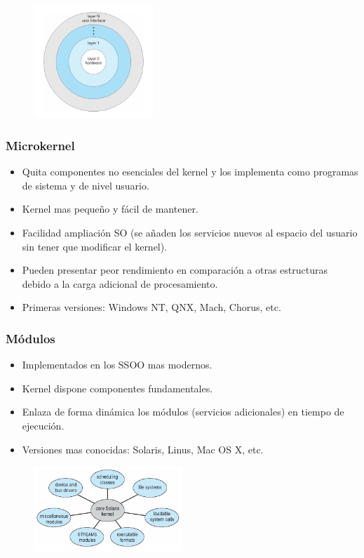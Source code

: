 \documentclass{templateNote}
\begin{document}
\begin{figure}[H]
    \centering
    \includegraphics[width=0.4\textwidth]{img/estNiv.png}
\end{figure}

\subsubsection*{Microkernel}
\begin{itemize}
    \item Quita componentes no esenciales del kernel y los implementa como programas de sistema y de nivel usuario.
    \item Kernel mas pequeño y fácil de mantener.
    \item Facilidad ampliación SO (se añaden los servicios nuevos al espacio del usuario sin tener que modificar el kernel).
    \item Pueden presentar peor rendimiento en comparación a otras estructuras debido a la carga adicional de procesamiento.
    \item Primeras versiones: Windows NT, QNX, Mach, Chorus, etc.
\end{itemize}

\subsubsection*{Módulos}
\begin{itemize}
    \item Implementados en los SSOO mas modernos.
    \item Kernel dispone componentes fundamentales.
    \item Enlaza de forma dinámica los módulos (servicios adicionales) en tiempo de ejecución.
    \item Versiones mas conocidas: Solaris, Linus, Mac OS X, etc.
\end{itemize}

\begin{figure}[H]
    \centering
    \includegraphics[width=0.5\textwidth]{img/estMod.png}
\end{figure}
\end{document}

